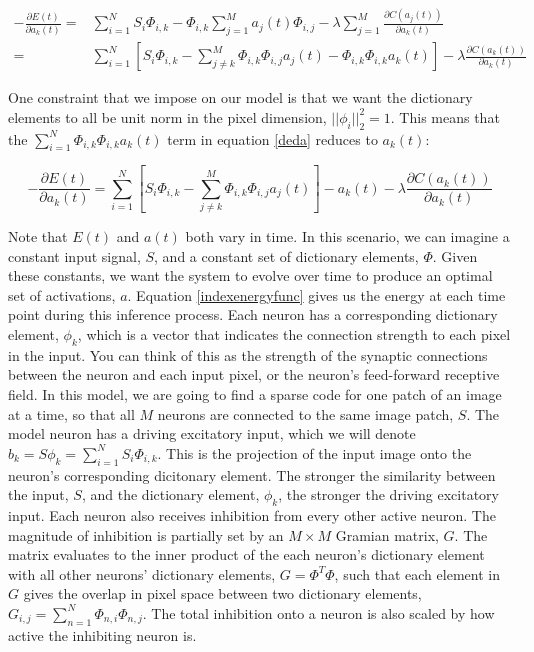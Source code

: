 \begin{align}\label{deda}
    - \frac{\partial E(t)}{\partial a_{k}(t)}
    =
        &\sum\limits_{i=1}^{N} S_{i} \Phi_{i,k} -
        \Phi_{i,k}\sum\limits_{j=1}^{M}a_{j}(t) \Phi_{i,j} -
        \lambda \sum\limits_{j=1}^{M}\frac{\partial C(a_{j}(t))}{\partial a_{k}(t)} \\
    =
        &\sum\limits_{i=1}^{N} \left[ S_{i} \Phi_{i,k} -
        \sum\limits_{j \neq k}^{M} \Phi_{i,k} \Phi_{i,j} a_{j}(t) - \Phi_{i,k}\Phi_{i,k}a_{k}(t) \right] -
        \lambda \frac{\partial C(a_{k}(t))}{\partial a_{k}(t)}
\end{align}

One constraint that we impose on our model is that we want the dictionary elements to all be unit norm in the pixel dimension, $||\phi_{i}||_2^2 = 1$. This means that the $\sum_{i=1}^{N}\Phi_{i,k}\Phi_{i,k}a_{k}(t)$ term in equation \eqref{deda} reduces to $a_k(t)$:

\begin{equation}
    -\frac{\partial E(t)}{\partial a_{k}(t)} =
    \sum\limits_{i=1}^{N} \left[ S_{i} \Phi_{i,k} -
    \sum\limits_{j \neq k}^{M} \Phi_{i,k} \Phi_{i,j} a_{j}(t) \right] - a_{k}(t) -
    \lambda \frac{\partial C(a_{k}(t))}{\partial a_{k}(t)}
\label{dedasimple}
\end{equation}

Note that $E(t)$ and $a(t)$ both vary in time. In this scenario, we can imagine a constant input signal, $S$, and a constant set of dictionary elements, $\Phi$. Given these constants, we want the system to evolve over time to produce an optimal set of activations, $a$. Equation \eqref{indexenergyfunc} gives us the energy at each time point during this inference process. Each neuron has a corresponding dictionary element, $\phi_{k}$, which is a vector that indicates the connection strength to each pixel in the input. You can think of this as the strength of the synaptic connections between the neuron and each input pixel, or the neuron's feed-forward receptive field. In this model, we are going to find a sparse code for one patch of an image at a time, so that all $M$ neurons are connected to the same image patch, $S$. The model neuron has a driving excitatory input, which we will denote $b_{k} = S\phi_{k} = \sum_{i=1}^{N}S_{i} \Phi_{i,k}$. This is the projection of the input image onto the neuron's corresponding dicitonary element. The stronger the similarity between the input, $S$, and the dictionary element, $\phi_{k}$, the stronger the driving excitatory input. Each neuron also receives inhibition from every other active neuron. The magnitude of inhibition is partially set by an $M \times M$ Gramian matrix, $G$. The matrix evaluates to the inner product of the each neuron's dictionary element with all other neurons' dictionary elements, $G = \Phi^T\Phi$, such that each element in $G$ gives the overlap in pixel space between two dictionary elements, $G_{i,j} = \sum\limits_{n=1}^{N} \Phi_{n,i}\Phi_{n,j}$. The total inhibition onto a neuron is also scaled by how active the inhibiting neuron is.

